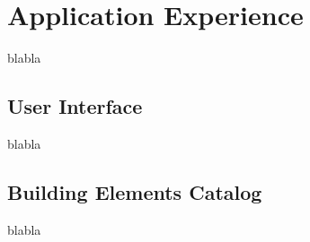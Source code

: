 \section{Application Experience}\label{sec:application}

blabla



\subsection{User Interface}\label{ssec:ui}

blabla



\subsection{Building Elements Catalog}\label{ssec:catalog}

blabla

